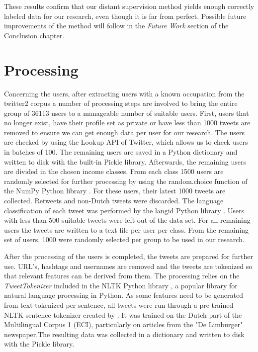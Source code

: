 \documentclass[
10pt, %
a4paper, %
oneside, %
headinclude,footinclude, %
] {book}%
\begin{document}
These results confirm that our distant supervision method yields enough correctly labeled data for our research, even though it is far from perfect. Possible future improvements of the method will follow in the \textit{Future Work} section of the Conclusion chapter.


\section{Processing}
Concerning the users, after extracting users with a known occupation from the twitter2 corpus a number of processing steps are involved to bring the entire group of 36113 users to a manageable number of suitable users. First, users that no longer exist, have their profile set as private or have less than 1000 tweets are removed to ensure we can get enough data per user for our research. The users are checked by using the Lookup API of Twitter, which allows us to check users in batches of 100. The remaining users are saved in a Python dictionary and written to disk with the built-in Pickle library. Afterwards, the remaining users are divided in the chosen income classes. From each class 1500 users are randomly selected for further processing by using the random.choice function of the NumPy Python library \citep{numpy}. For these users, their latest 1000 tweets are collected. Retweets and non-Dutch tweets were discarded. The language classification of each tweet was performed by the langid Python library \citep{langid}. Users with less than 500 suitable tweets were left out of the data set. For all remaining users the tweets are written to a text file per user per class. From the remaining set of users, 1000 were randomly selected per group to be used in our research.

After the processing of the users is completed, the tweets are prepared for further use. URL's, hashtags and usernames are removed and the tweets are tokenized so that relevant features can be derived from them. The processing relies on the \textit{TweetTokenizer} included in the NLTK Python library \citep{nltk}, a popular library for natural language processing in Python. As some features need to be generated from text tokenized per sentence, all tweets were run through a pre-trained NLTK sentence tokenizer created by \citet{punkt}. It was trained on the Dutch part of the Multilingual Corpus 1 (ECI), particularly on articles from the "De Limburger" newspaper.The resulting data was collected in a dictionary and written to disk with the Pickle library.
\end{document}
